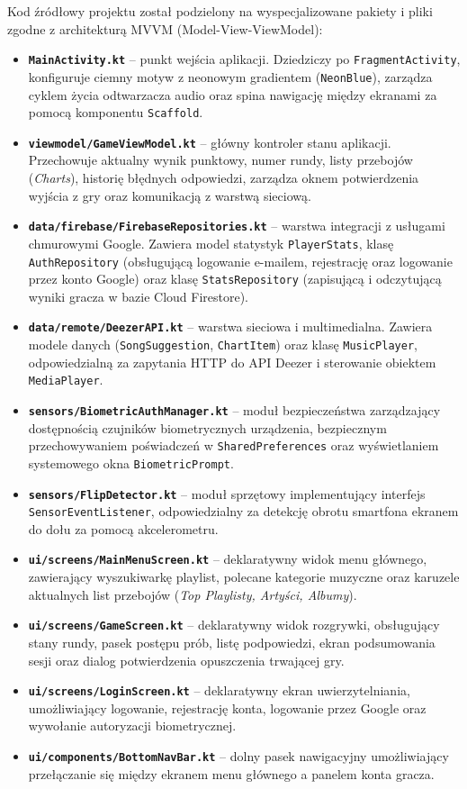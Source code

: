 \hspace{0.60cm}Kod źródłowy projektu został podzielony na wyspecjalizowane pakiety i pliki zgodne z architekturą MVVM (Model-View-ViewModel):
\begin{itemize}
    \item \textbf{\texttt{MainActivity.kt}} – punkt wejścia aplikacji. Dziedziczy po \texttt{FragmentActivity}, konfiguruje ciemny motyw z neonowym gradientem (\texttt{NeonBlue}), zarządza cyklem życia odtwarzacza audio oraz spina nawigację między ekranami za pomocą komponentu \texttt{Scaffold}.
    \item \textbf{\texttt{viewmodel/GameViewModel.kt}} – główny kontroler stanu aplikacji. Przechowuje aktualny wynik punktowy, numer rundy, listy przebojów (\textit{Charts}), historię błędnych odpowiedzi, zarządza oknem potwierdzenia wyjścia z gry oraz komunikacją z warstwą sieciową.
    \item \textbf{\texttt{data/firebase/FirebaseRepositories.kt}} – warstwa integracji z usługami chmurowymi Google. Zawiera model statystyk \texttt{PlayerStats}, klasę \texttt{AuthRepository} (obsługującą logowanie e-mailem, rejestrację oraz logowanie przez konto Google) oraz klasę \texttt{StatsRepository} (zapisującą i odczytującą wyniki gracza w bazie Cloud Firestore).
    \item \textbf{\texttt{data/remote/DeezerAPI.kt}} – warstwa sieciowa i multimedialna. Zawiera modele danych (\texttt{SongSuggestion}, \texttt{ChartItem}) oraz klasę \texttt{MusicPlayer}, odpowiedzialną za zapytania HTTP do API Deezer i sterowanie obiektem \texttt{MediaPlayer}.
    \item \textbf{\texttt{sensors/BiometricAuthManager.kt}} – moduł bezpieczeństwa zarządzający dostępnością czujników biometrycznych urządzenia, bezpiecznym przechowywaniem poświadczeń w \texttt{SharedPreferences} oraz wyświetlaniem systemowego okna \texttt{BiometricPrompt}.
    \item \textbf{\texttt{sensors/FlipDetector.kt}} – moduł sprzętowy implementujący interfejs \texttt{SensorEventListener}, odpowiedzialny za detekcję obrotu smartfona ekranem do dołu za pomocą akcelerometru.
    \item \textbf{\texttt{ui/screens/MainMenuScreen.kt}} – deklaratywny widok menu głównego, zawierający wyszukiwarkę playlist, polecane kategorie muzyczne oraz karuzele aktualnych list przebojów (\textit{Top Playlisty, Artyści, Albumy}).
    \item \textbf{\texttt{ui/screens/GameScreen.kt}} – deklaratywny widok rozgrywki, obsługujący stany rundy, pasek postępu prób, listę podpowiedzi, ekran podsumowania sesji oraz dialog potwierdzenia opuszczenia trwającej gry.
    \item \textbf{\texttt{ui/screens/LoginScreen.kt}} – deklaratywny ekran uwierzytelniania, umożliwiający logowanie, rejestrację konta, logowanie przez Google oraz wywołanie autoryzacji biometrycznej.
    \item \textbf{\texttt{ui/components/BottomNavBar.kt}} – dolny pasek nawigacyjny umożliwiający przełączanie się między ekranem menu głównego a panelem konta gracza.
\end{itemize}

